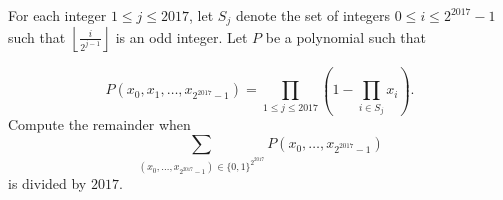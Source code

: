 For each integer $1\le j\le 2017$, let $S_j$ denote the set of integers $0\le i\le 2^{2017} - 1$ such that $\left\lfloor \frac{i}{2^{j-1}} \right\rfloor$ is an odd integer. Let $P$ be a polynomial such that

\[P\left(x_0, x_1, \ldots, x_{2^{2017} - 1}\right) = \prod_{1\le j\le 2017} \left(1 - \prod_{i\in S_j} x_i\right).\]
Compute the remainder when
\[ \sum_{\left(x_0, \ldots, x_{2^{2017} - 1}\right)\in\{0, 1\}^{2^{2017}}} P\left(x_0, \ldots, x_{2^{2017} - 1}\right)\]
is divided by $2017$.
